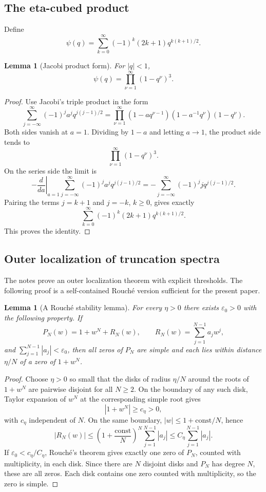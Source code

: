 \documentclass[11pt,a4paper,reqno]{amsart}
\newtheorem{lemma}[theorem]{Lemma}
\theoremstyle{remark}
\begin{document}
\subsection{The eta-cubed product}
Define
\[
        \psi(q)=\sum_{k=0}^{\infty}(-1)^k(2k+1)q^{k(k+1)/2}.
\]

\begin{lemma}[Jacobi product form]\label{lem:eta-cubed}
For \(|q|<1\),
\[
        \psi(q)=\prod_{\nu=1}^{\infty}(1-q^\nu)^3.
\]
\end{lemma}

\begin{proof}
Use Jacobi's triple product in the form
\[
 \sum_{j=-\infty}^{\infty}(-1)^j a^j q^{j(j-1)/2}
 =\prod_{\nu=1}^{\infty}(1-aq^{\nu-1})(1-a^{-1}q^\nu)(1-q^\nu).
\]
Both sides vanish at \(a=1\).  Dividing by \(1-a\) and letting \(a\to1\), the product side tends to
\[
        \prod_{\nu=1}^{\infty}(1-q^\nu)^3.
\]
On the series side the limit is
\[
        -\left.\frac{d}{da}\right|_{a=1}
        \sum_{j=-\infty}^{\infty}(-1)^j a^j q^{j(j-1)/2}
        =-\sum_{j=-\infty}^{\infty}(-1)^j j q^{j(j-1)/2}.
\]
Pairing the terms \(j=k+1\) and \(j=-k\), \(k\ge0\), gives exactly
\[
        \sum_{k=0}^{\infty}(-1)^k(2k+1)q^{k(k+1)/2}.
\]
This proves the identity.
\end{proof}

\subsection{Outer localization of truncation spectra}
The notes prove an outer localization theorem with explicit thresholds.  The following proof is a self-contained Rouch\'e version sufficient for the present paper.

\begin{lemma}[A Rouch\'e stability lemma]\label{lem:rouche-stability}
For every \(\eta>0\) there exists \(\varepsilon_0>0\) with the following property.  If
\[
        P_N(w)=1+w^N+R_N(w),
        \qquad
        R_N(w)=\sum_{j=1}^{N-1}a_jw^j,
\]
and \(\sum_{j=1}^{N-1}|a_j|<\varepsilon_0\), then all zeros of \(P_N\) are simple and each lies within distance \(\eta/N\) of a zero of \(1+w^N\).
\end{lemma}

\begin{proof}
Choose \(\eta>0\) so small that the disks of radius \(\eta/N\) around the roots of \(1+w^N\) are pairwise disjoint for all \(N\ge2\).  On the boundary of any such disk, Taylor expansion of \(w^N\) at the corresponding simple root gives
\[
        |1+w^N|\ge c_\eta>0,
\]
with \(c_\eta\) independent of \(N\).  On the same boundary, \(|w|\le 1+\text{const}/N\), hence
\[
        |R_N(w)|\le \left(1+\frac{\text{const}}N\right)^N\sum_{j=1}^{N-1}|a_j|
        \le C_\eta\sum_{j=1}^{N-1}|a_j|.
\]
If \(\varepsilon_0<c_\eta/C_\eta\), Rouch\'e's theorem gives exactly one zero of \(P_N\), counted with multiplicity, in each disk.  Since there are \(N\) disjoint disks and \(P_N\) has degree \(N\), these are all zeros.  Each disk contains one zero counted with multiplicity, so the zero is simple.
\end{proof}
\end{document}
